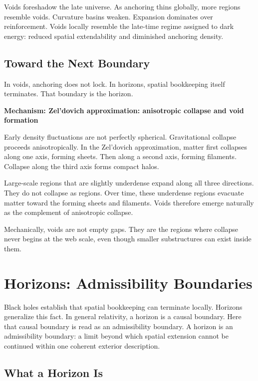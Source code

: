 \documentclass[11pt,twoside,openright]{book}
\newenvironment{mechanismbox}[1]
  {\begin{framed}\noindent\textbf{Mechanism: #1}\par\medskip}
  {\end{framed}}
\begin{document}
Voids foreshadow the late universe. As anchoring thins globally, more regions resemble voids. Curvature basins weaken. Expansion dominates over reinforcement. Voids locally resemble the late-time regime assigned to dark energy: reduced spatial extendability and diminished anchoring density.

\section*{Toward the Next Boundary}

In voids, anchoring does not lock. In horizons, spatial bookkeeping itself terminates. That boundary is the horizon.

\begin{mechanismbox}{Zel'dovich approximation: anisotropic collapse and void formation}

Early density fluctuations are not perfectly spherical. Gravitational collapse proceeds anisotropically. In the Zel'dovich approximation, matter first collapses along one axis, forming sheets. Then along a second axis, forming filaments. Collapse along the third axis forms compact halos.

Large-scale regions that are slightly underdense expand along all three directions. They do not collapse as regions. Over time, these underdense regions evacuate matter toward the forming sheets and filaments. Voids therefore emerge naturally as the complement of anisotropic collapse.

Mechanically,
voids are not empty gaps.
They are the regions where collapse never begins
at the web scale,
even though smaller substructures can exist inside them.
\end{mechanismbox}

\chapter{Horizons: Admissibility Boundaries}

Black holes establish that spatial bookkeeping can terminate locally. Horizons generalize this fact. In general relativity, a horizon is a causal boundary. Here that causal boundary is read as an admissibility boundary. A horizon is an admissibility boundary: a limit beyond which spatial extension cannot be continued within one coherent exterior description.

\section*{What a Horizon Is}
\end{document}
